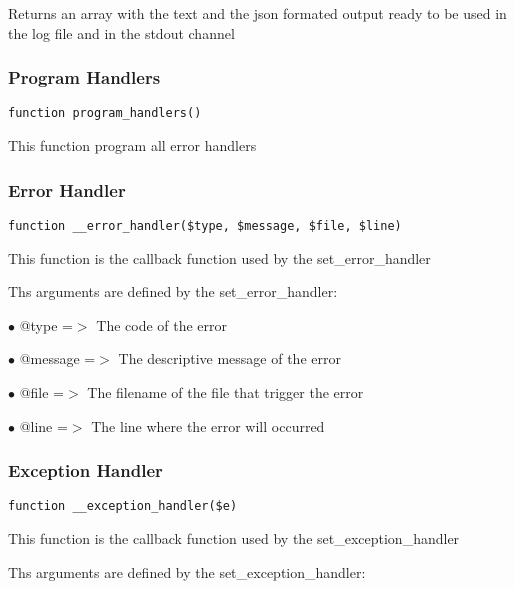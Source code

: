 \documentclass[a4paper]{article}
\begin{document}
Returns an array with the text and the json formated output ready to be used
in the log file and in the stdout channel

\hypertarget{toc113}{}
\subsubsection{Program Handlers}

\begin{lstlisting}
function program_handlers()
\end{lstlisting}

This function program all error handlers

\hypertarget{toc114}{}
\subsubsection{Error Handler}

\begin{lstlisting}
function __error_handler($type, $message, $file, $line)
\end{lstlisting}

This function is the callback function used by the set\_error\_handler

Ths arguments are defined by the set\_error\_handler:

\begin{compactitem}
\item[\color{myblue}$\bullet$] @type    =$>$ The code of the error
\item[\color{myblue}$\bullet$] @message =$>$ The descriptive message of the error
\item[\color{myblue}$\bullet$] @file    =$>$ The filename of the file that trigger the error
\item[\color{myblue}$\bullet$] @line    =$>$ The line where the error will occurred
\end{compactitem}

\hypertarget{toc115}{}
\subsubsection{Exception Handler}

\begin{lstlisting}
function __exception_handler($e)
\end{lstlisting}

This function is the callback function used by the set\_exception\_handler

Ths arguments are defined by the set\_exception\_handler:
\end{document}
